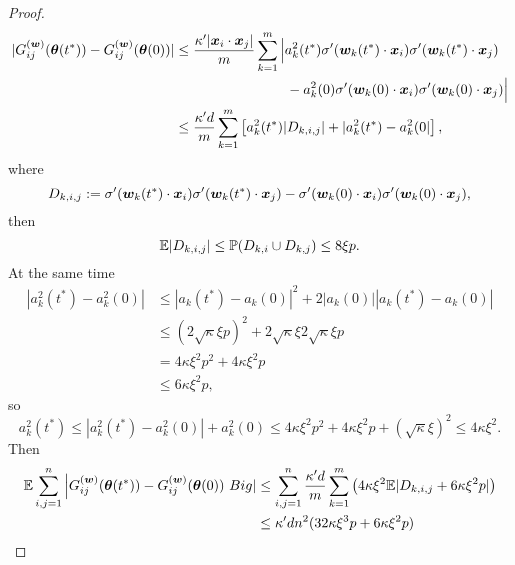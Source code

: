 \documentclass{article}
\begin{document}
\begin{proof}
\begin{equation}
\begin{aligned}
            |G^{(\bm{w})}_{ij}(\bm{\theta}(t^*))-G^{(\bm{w})}_{ij}(\bm{\theta}(0))|
             & \leq \frac{\kappa'|\bm{x}_i\cdot\bm{x}_j|}{m}\sum_{k=1}^m\Big|a_k^2(t^*)\sigma'(\bm{w}_k(t^*)\cdot\bm{x}_i)\sigma'(\bm{w}_k(t^*)\cdot\bm{x}_j) \\
             & \quad\quad\quad\quad\quad\quad\quad\quad -a_k^2(0)\sigma'(\bm{w}_k(0)\cdot\bm{x}_i)\sigma'(\bm{w}_k(0)\cdot\bm{x}_j)\Big|                \\
             & \leq \frac{\kappa'd}{m}\sum_{k=1}^m\left[a_k^2(t^*)|D_{k,i,j}|+|a_k^2(t^*)-a_k^2(0|\right],
        \end{aligned}
    \end{equation}
    where
    \begin{equation}
        D_{k,i,j}:=\sigma'(\bm{w}_k(t^*)\cdot\bm{x}_i)\sigma'(\bm{w}_k(t^*)\cdot\bm{x}_j)-\sigma'(\bm{w}_k(0)\cdot\bm{x}_i)\sigma'(\bm{w}_k(0)\cdot\bm{x}_j),
    \end{equation}
    then
    \begin{equation}
        \mathbb{E}|D_{k,i,j}|\leq\mathbb{P}(D_{k,i}\cup D_{k,j})\leq 8\xi p.
    \end{equation}
    At the same time
    \begin{equation}
        \begin{aligned}
            |a_k^2(t^*)-a_k^2(0)|
             & \leq|a_k(t^*)-a_k(0)|^2+2|a_k(0)||a_k(t^*)-a_k(0)|                 \\
             & \leq (2\sqrt{\kappa}\xi p)^2+2\sqrt{\kappa}\xi 2\sqrt{\kappa}\xi p \\
             & =4\kappa\xi^2 p^2+4\kappa\xi^2 p                                   \\
             & \leq 6\kappa\xi^2 p,
        \end{aligned}
    \end{equation}
    so
    \begin{equation}
        a_k^2(t^*)\leq |a_k^2(t^*)-a_k^2(0)|+a_k^2(0) \leq 4\kappa\xi^2 p^2+4\kappa\xi^2 p+(\sqrt{\kappa}\xi)^2\leq 4\kappa\xi^2.
    \end{equation}
    Then
    \begin{equation}
        \begin{aligned}
            \Exp\sum_{i,j=1}^n\Big|G_{ij}^{(\vw)}(\vtheta(t^*))-G_{ij}^{(\vw)}(\vtheta(0))\
            Big|
             & \leq\sum_{i,j=1}^n\frac{\kappa' d}{m}\sum_{k=1}^m\left(4\kappa\xi^2\Exp|D_{k,i,j}+6\kappa\xi^2 p|\right) \\
             & \leq \kappa' d n^2(32\kappa\xi^3 p + 6\kappa\xi^2 p)                                                     \\

\end{aligned}
\end{equation}
\end{proof}
\end{document}
